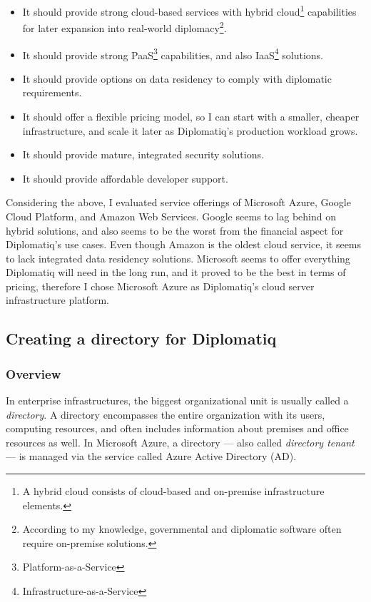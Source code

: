 \begin{itemize}
\item It should provide strong cloud-based services with hybrid cloud\footnote{A hybrid cloud consists of cloud-based and on-premise infrastructure elements.} capabilities for later expansion into real-world diplomacy\footnote{According to my knowledge, governmental and diplomatic software often require on-premise solutions.}.
\item It should provide strong PaaS\footnote{Platform-as-a-Service} capabilities, and also IaaS\footnote{Infrastructure-as-a-Service} solutions.
\item It should provide options on data residency to comply with diplomatic requirements.
\item It should offer a flexible pricing model, so I can start with a smaller, cheaper infrastructure, and scale it later as Diplomatiq's production workload grows.
\item It should provide mature, integrated security solutions.
\item It should provide affordable developer support.
\end{itemize}

Considering the above, I evaluated service offerings of Microsoft Azure, Google Cloud Platform, and Amazon Web Services. Google seems to lag behind on hybrid solutions, and also seems to be the worst from the financial aspect for Diplomatiq's use cases. Even though Amazon is the oldest cloud service, it seems to lack integrated data residency solutions. Microsoft seems to offer everything Diplomatiq will need in the long run, and it proved to be the best in terms of pricing, therefore I chose Microsoft Azure as Diplomatiq's cloud server infrastructure platform.

\subsection{Creating a directory for Diplomatiq}

\subsubsection{Overview}

In enterprise infrastructures, the biggest organizational unit is usually called a \emph{directory}. A directory encompasses the entire organization with its users, computing resources, and often includes information about premises and office resources as well. In Microsoft Azure, a directory — also called \emph{directory tenant} — is managed via the service called Azure Active Directory (AD).


